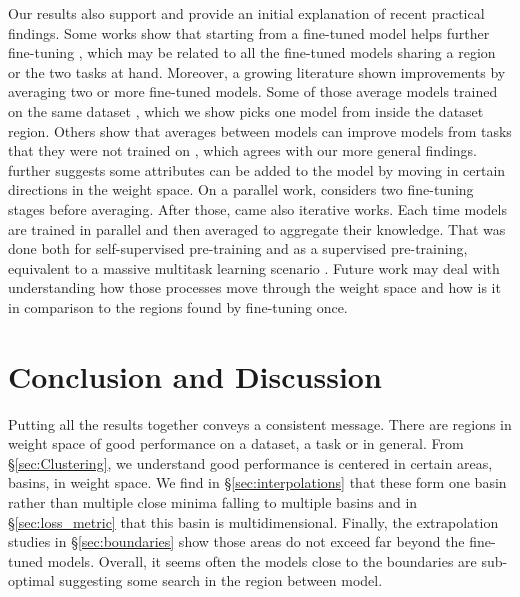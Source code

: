 \documentclass[nohyperref]{article}
\theoremstyle{plain}
\theoremstyle{definition}
\theoremstyle{remark}
\begin{document}
Our results also support and provide an initial explanation of recent practical findings. Some works show that starting from a fine-tuned  model helps further fine-tuning \citep{choshen2022start, Phang2018SentenceEO}, which may be related to all the fine-tuned  models sharing a region or the two tasks at hand. Moreover, a growing literature shown improvements by averaging two or more fine-tuned models. Some of those average models trained on the same dataset \citep{Wortsman2022ModelSA,wortsman2022fi}, which we show picks one model from inside the dataset region. Others show that averages between models can improve models from tasks that they were not trained on \citep{choshen2022fusing,matena2021merging}, which agrees with our more general findings. \citet{ilharco2022editing} further suggests some attributes can be added to the model by moving in certain directions in the weight space. On a parallel work, \citet{Rame2022RecyclingDM} considers two fine-tuning stages before averaging.
After those, came also iterative works. Each time models are trained in parallel and then averaged to aggregate their knowledge. That was done both for self-supervised pre-training \citep{li2022branch} and as a supervised pre-training, equivalent to a massive multitask learning scenario \citep{don2022cold}. Future work may deal with understanding how those processes move through the weight space and how is it in comparison to the regions found by fine-tuning once. %

\section{Conclusion and Discussion}
Putting all the results together conveys a consistent message. There are regions in weight space of good performance on a dataset, a task or in general. From \S\ref{sec:Clustering}, we understand good performance is centered in certain areas, basins, in weight space. We find in \S\ref{sec:interpolations} that these form one basin rather than multiple close minima falling to multiple basins and in \S\ref{sec:loss_metric} that this basin is multidimensional. Finally, the extrapolation studies in \S\ref{sec:boundaries} show those areas do not exceed far beyond the fine-tuned models. Overall, it seems often the models close to the boundaries are sub-optimal suggesting some search in the region between model.
\end{document}

